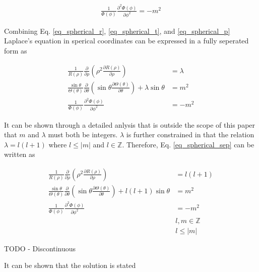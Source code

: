 \documentclass{article}
\numberwithin{equation}{subsection}
\begin{document}
\begin{equation}\label{eq_spherical_p}
\begin{split}
\frac{1}{\Phi(\phi)} 
\frac{\partial^2 \Phi(\phi)}{\partial \phi^2} = -m^2
\end{split}
\end{equation}

Combining Eq. \ref{eq_spherical_r}, \ref{eq_spherical_t}, and \ref{eq_spherical_p} Laplace's equation in sperical coordinates can be expressed in a fully seperated form as

\begin{equation}\label{eq_spherical_sep}
\begin{split}
\frac{1}{R(\rho)}
\frac{\partial}{\partial \rho} 
\left( \rho^2 \frac{\partial R(\rho)}{\partial \rho}\right) 
&= \lambda \\
\frac{\sin \theta}{\Theta(\theta)}
\frac{\partial}{\partial \theta}
\left( \sin \theta \frac{\partial \Theta(\theta)}{\partial \theta}\right) 
+ \lambda \sin \theta
&= m^2 \\
\frac{1}{\Phi(\phi)} 
\frac{\partial^2 \Phi(\phi)}{\partial \phi^2}
&= -m^2
\end{split}
\end{equation}

It can be shown through a detailed anlysis that is outside the scope of this paper that $m$ and $\lambda$ must both be integers. $\lambda$ is further constrained in that the relation $\lambda = l(l+1)$ where $l \leq |m|$ and $l \in \mathbb{Z}$. Therefore, Eq. \ref{eq_spherical_sep} can be written as

\begin{equation}\label{eq_spherical_sep2}
\begin{split}
\frac{1}{R(\rho)}
\frac{\partial}{\partial \rho} 
\left( \rho^2 \frac{\partial R(\rho)}{\partial \rho}\right) 
&= l(l+1) \\
\frac{\sin \theta}{\Theta(\theta)}
\frac{\partial}{\partial \theta}
\left( \sin \theta \frac{\partial \Theta(\theta)}{\partial \theta}\right) 
+ l(l+1) \sin \theta
&= m^2 \\
\frac{1}{\Phi(\phi)} 
\frac{\partial^2 \Phi(\phi)}{\partial \phi^2}
&= -m^2 \\
& l, m \in \mathbb{Z} \\
& l \leq |m|
\end{split}
\end{equation}

TODO - Discontinuous

It can be shown that the solution is stated
\end{document}
